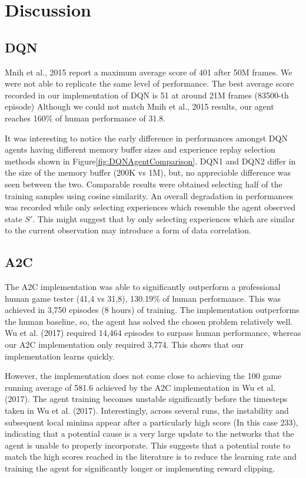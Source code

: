 \documentclass{article}
\begin{document}
\section{Discussion}
    

\subsection{DQN}
Mnih et al., 2015 report a maximum average score of 401 after 50M frames. We were not able to replicate the same level of performance. The best average score recorded in our implementation of DQN is 51 at around 21M frames (83500-th episode) Although we could not match Mnih et al., 2015 results, our agent reaches 160\% of human performance of 31.8.

It was interesting to notice the early difference in performances amongst DQN agents having different memory buffer sizes and experience replay selection methods shown in Figure\ref{fig:DQNAgentComparison}. DQN1 and DQN2 differ in the size of the memory buffer (200K vs 1M), but, no appreciable difference was seen between the two. Comparable results were obtained selecting half of the training samples using cosine similarity. An overall degradation in performances was recorded while only selecting experiences which resemble the agent observed state $S'$. This might suggest that by only selecting experiences which are similar to the current observation may introduce a form of data correlation.

\subsection{A2C}

The A2C implementation was able to significantly outperform a professional human game tester (41,4 vs 31,8), 130.19\% of human performance. This was achieved in 3,750 episodes (8 hours) of training. The implementation outperforms the human baseline, so, the agent has solved the chosen problem relatively well. Wu et al. (2017) required 14,464 episodes to surpass human performance, whereas our A2C implementation only required 3,774. This shows that our implementation learns quickly.

However, the implementation does not come close to achieving the 100 game running average of 581.6 achieved by the A2C implementation in Wu et al. (2017). The agent training becomes unstable significantly before the timesteps taken in Wu et al. (2017). Interestingly, across several runs, the instability and subsequent local minima appear after a particularly high score (In this case 233), indicating that a potential cause is a very large update to the networks that the agent is unable to properly incorporate. This suggests that a potential route to match the high scores reached in the literature is to reduce the learning rate and training the agent for significantly longer or implementing reward clipping.
\end{document}
